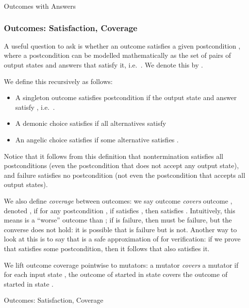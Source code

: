 \documentclass{CSML}
\theoremstyle{definition}\newtheorem{notation}[thm]{Notation}
\theoremstyle{plain}\newtheorem{satz}[thm]{Satz}
\begin{document}
\begin{defi}{Outcomes with Answers}







\end{defi}

\subsubsection{Outcomes: Satisfaction, Coverage}

A useful question to ask is whether an outcome  satisfies a given postcondition 
, where a postcondition can be modelled mathematically as 
the set of pairs of output states and answers that satisfy it, i.e.~. We denote this by .

We define this recursively as follows:
\begin{itemize}
\item A singleton outcome  satisfies 
    postcondition  if the output state  and answer  satisfy
    , i.e.~.
\item A demonic choice  
    satisfies  if all alternatives satisfy 
\item An angelic choice  
    satisfies  if some alternative satisfies .
\end{itemize}

Notice that it follows from this definition that nontermination 
satisfies all postconditions (even the postcondition that does 
not accept any output state), and failure satisfies no 
postcondition (not even the postcondition that accepts all output 
states).

We also define \emph{coverage} between outcomes: we say outcome 
 \emph{covers} outcome , denoted , if for any postcondition , if  satisfies , 
then  satisfies . Intuitively, this means  is a 
``worse'' outcome than ; if  is failure, then 
 must be failure, but the converse does not hold: it is 
possible that  is failure but  is not. Another way
to look at this is to say that  is a safe approximation of  for verification:
if we prove that  satisfies some postcondition,
then it follows that  also satisfies it.

We lift outcome coverage pointwise to mutators: a mutator  
\emph{covers} a mutator  if for each input state , the outcome 
of  started in state  covers the outcome of  started in 
state . 

\begin{defi}{Outcomes: Satisfaction, Coverage}






\end{defi}
\end{document}
